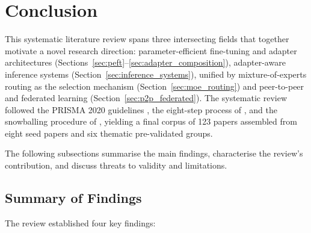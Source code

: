 \section{Conclusion}
\label{sec:conclusion}

This systematic literature review spans three intersecting fields
that together motivate a novel research direction: parameter-efficient fine-tuning
and adapter architectures (Sections~\ref{sec:peft}--\ref{sec:adapter_composition}),
adapter-aware inference systems (Section~\ref{sec:inference_systems}), unified by
mixture-of-experts routing as the selection mechanism (Section~\ref{sec:moe_routing}) and
peer-to-peer and federated learning (Section~\ref{sec:p2p_federated}).
The systematic review followed the PRISMA 2020 guidelines \citep{Page2021}, the
eight-step process of \citet{XiaoWatson2019}, and the snowballing procedure of
\citet{Wohlin2014}, yielding a final corpus of 123 papers assembled from eight seed
papers and six thematic pre-validated groups.

The following subsections summarise the main findings, characterise the review's contribution, and discuss threats to validity and limitations.

\subsection{Summary of Findings}
\label{sec:conclusion:summary}

The review established four key findings:

